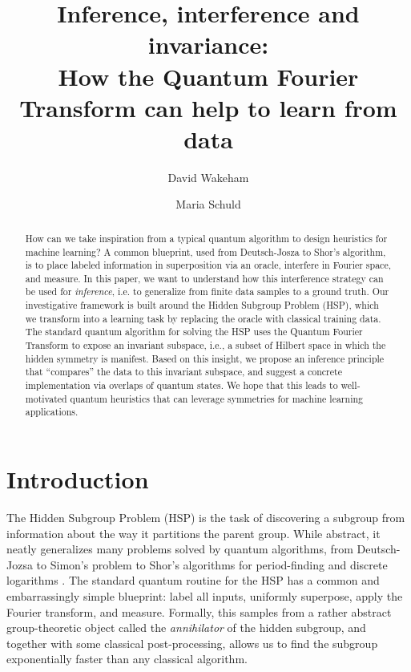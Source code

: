 \documentclass[aps, pre,reprint,nofootinbib,citeautoscript,floatfix]{revtex4-1}
\begin{document}
\title{Inference, interference and invariance: \\ 
How the Quantum Fourier Transform can help to learn from data}

\author{David Wakeham}
\author{Maria Schuld}

\begin{abstract}
How can we take inspiration from a typical quantum algorithm to design heuristics for machine learning? A common blueprint,
used from Deutsch-Josza to Shor's algorithm, is to place labeled information in superposition via an oracle, 
interfere in Fourier space, and measure.
In this paper, we want to understand how this interference strategy can be used for \textit{inference}, i.e. to generalize from finite data samples to a ground truth. Our investigative framework is built around the  
Hidden Subgroup Problem (HSP), which we transform into a learning task by replacing the oracle with classical training data. 
The standard quantum algorithm for solving the HSP uses the Quantum Fourier Transform to expose an invariant subspace, i.e., a subset of Hilbert space in which the hidden symmetry is manifest. Based on this insight, we propose an inference principle that ``compares'' the data to this invariant subspace, and suggest a concrete implementation via overlaps of quantum states. We hope that this leads to well-motivated quantum heuristics that can leverage symmetries for machine learning applications.

\end{abstract}

\maketitle

\section{Introduction}

The Hidden Subgroup Problem (HSP) \cite{Hallgren2003, Ettinger_2004}
is the task of discovering a subgroup from information about the way it partitions the parent group.
While abstract, it neatly generalizes many problems solved by quantum algorithms, from Deutsch-Jozsa \cite{DJ} to Simon's
problem \cite{Simon} to Shor's algorithms for period-finding and discrete logarithms \cite{shor}.
The standard quantum routine for the HSP \cite{Childs_2010} has a common and embarrassingly
simple blueprint: label all inputs, uniformly superpose, apply the
Fourier transform, and measure. Formally, this samples from a rather abstract group-theoretic object called the \textit{annihilator} of the hidden subgroup, and together with some classical post-processing, allows us to find the subgroup exponentially faster than any classical algorithm.
\end{document}
